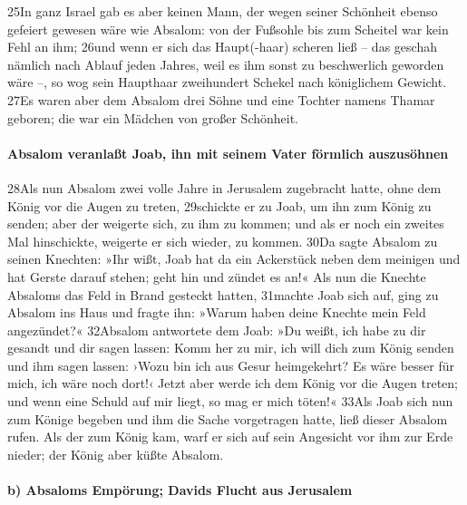 25In ganz Israel gab es aber keinen Mann, der wegen seiner Schönheit
ebenso gefeiert gewesen wäre wie Absalom: von der Fußsohle bis zum
Scheitel war kein Fehl an ihm; 26und wenn er sich das Haupt(-haar)
scheren ließ -- das geschah nämlich nach Ablauf jeden Jahres, weil es
ihm sonst zu beschwerlich geworden wäre --, so wog sein Haupthaar
zweihundert Schekel nach königlichem Gewicht. 27Es waren aber dem
Absalom drei Söhne und eine Tochter namens Thamar geboren; die war ein
Mädchen von großer Schönheit.

\hypertarget{absalom-veranlauxdft-joab-ihn-mit-seinem-vater-fuxf6rmlich-auszusuxf6hnen}{%
\paragraph{Absalom veranlaßt Joab, ihn mit seinem Vater förmlich
auszusöhnen}\label{absalom-veranlauxdft-joab-ihn-mit-seinem-vater-fuxf6rmlich-auszusuxf6hnen}}

28Als nun Absalom zwei volle Jahre in Jerusalem zugebracht hatte, ohne
dem König vor die Augen zu treten, 29schickte er zu Joab, um ihn zum
König zu senden; aber der weigerte sich, zu ihm zu kommen; und als er
noch ein zweites Mal hinschickte, weigerte er sich wieder, zu kommen.
30Da sagte Absalom zu seinen Knechten: »Ihr wißt, Joab hat da ein
Ackerstück neben dem meinigen und hat Gerste darauf stehen; geht hin und
zündet es an!« Als nun die Knechte Absaloms das Feld in Brand gesteckt
hatten, 31machte Joab sich auf, ging zu Absalom ins Haus und fragte ihn:
»Warum haben deine Knechte mein Feld angezündet?« 32Absalom antwortete
dem Joab: »Du weißt, ich habe zu dir gesandt und dir sagen lassen: Komm
her zu mir, ich will dich zum König senden und ihm sagen lassen: ›Wozu
bin ich aus Gesur heimgekehrt? Es wäre besser für mich, ich wäre noch
dort!‹ Jetzt aber werde ich dem König vor die Augen treten; und wenn
eine Schuld auf mir liegt, so mag er mich töten!« 33Als Joab sich nun
zum Könige begeben und ihm die Sache vorgetragen hatte, ließ dieser
Absalom rufen. Als der zum König kam, warf er sich auf sein Angesicht
vor ihm zur Erde nieder; der König aber küßte Absalom.

\hypertarget{b-absaloms-empuxf6rung-davids-flucht-aus-jerusalem}{%
\paragraph{b) Absaloms Empörung; Davids Flucht aus
Jerusalem}\label{b-absaloms-empuxf6rung-davids-flucht-aus-jerusalem}}

